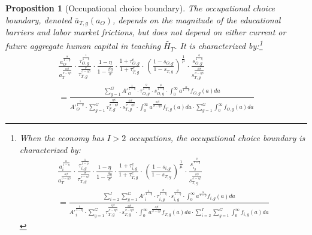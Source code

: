 \documentclass[onehalfspacing,11pt]{article}
\newtheorem{prp}{Proposition}
\begin{document}
\begin{prp}[Occupational choice boundary] The occupational choice boundary, denoted $\bar{a}_{T,g}(a_O)$, depends on the magnitude of the educational barriers and labor market frictions, but does not depend on either current or future aggregate human capital in teaching $\widetilde{H_T}$. It is characterized by:\footnote{When the economy has $I>2$ occupations, the occupational choice boundary is characterized by:
\begin{align*}
\frac{a_i^{\frac{\alpha}{1-\eta}}}{a_T^{\frac{\alpha\beta}{\sigma-\eta\beta}}} \cdot \frac{\tau_{i,g}^\frac{1}{1-\eta}}{\tau_{T,g}^\frac{\sigma}{\sigma-\eta\beta}} \cdot \frac{1-\eta}{1-\tfrac{\beta \eta}{\sigma}} \cdot \frac{1+\tau^e_{i,g}}{1+\tau^e_{T,g}} \cdot \left(\frac{1-s_{i,g}}{1-s_{T,g}}\right)^\frac{1}{\mu} \cdot \frac{s_{i_g}^\frac{\phi}{1-\eta}}{s_{T,g}^\frac{\phi\beta}{\sigma-\eta\beta}} \nonumber\\
= \frac{\sum_{i=2}^I \sum_{g=1}^G {A'}_i^\frac{1}{1-\eta} \cdot \tau_{i,g}^\frac{\eta}{1-\eta} \cdot s_{i,g}^{\frac{\phi}{1-\eta}} \cdot \int_0^\infty a^{\frac{\alpha}{1-\eta}} f_{i,g}(a)da }{{A'}_i^\frac{1}{1-\eta} \cdot \sum_{g=1}^G \tau_{T,g}^\frac{\eta\beta}{\sigma-\eta\beta} \cdot s_{T,g}^\frac{\phi\beta}{\sigma-\eta\beta} \cdot \int_0^\infty a^{\frac{\alpha\beta}{\sigma-\eta\beta}} f_{T,g}(a)da \cdot \sum_{i=2}^I \sum_{g=1}^G \int_0^\infty f_{i,g}(a)da  } 
\end{align*}
}
\begin{align}
\label{eq:occChoice}
\frac{a_O^{\frac{\alpha}{1-\eta}}}{a_T^{\frac{\alpha\beta}{\sigma-\eta\beta}}} \cdot \frac{\tau_{O,g}^\frac{1}{1-\eta}}{\tau_{T,g}^\frac{\sigma}{\sigma-\eta\beta}} \cdot \frac{1-\eta}{1-\tfrac{\beta \eta}{\sigma}} \cdot \frac{1+\tau^e_{O,g}}{1+\tau^e_{T,g}} \cdot \left(\frac{1-s_{O,g}}{1-s_{T,g}}\right)^\frac{1}{\mu} \cdot \frac{s_{O,g}^\frac{\phi}{1-\eta}}{s_{T,g}^\frac{\phi\beta}{\sigma-\eta\beta}} \nonumber\\
= \frac{\sum_{g=1}^G {A'}_O^{\frac{1}{1-\eta}} \cdot \tau_{O,g}^\frac{\eta}{1-\eta} \cdot s_{O,g}^{\frac{\phi}{1-\eta}} \cdot \int_0^\infty a^{\frac{\alpha}{1-\eta}} f_{O,g}(a)da }{{A'}_O^\frac{1}{1-\eta} \cdot \sum_{g=1}^G \tau_{T,g}^\frac{\eta\beta}{\sigma-\eta\beta} \cdot s_{T,g}^\frac{\phi\beta}{\sigma-\eta\beta} \cdot \int_0^\infty a^{\frac{\alpha\beta}{\sigma-\eta\beta}} f_{T,g}(a)da \cdot \sum_{g=1}^G \int_0^\infty f_{O,g}(a)da  } 
\end{align}
\end{prp}
\end{document}
